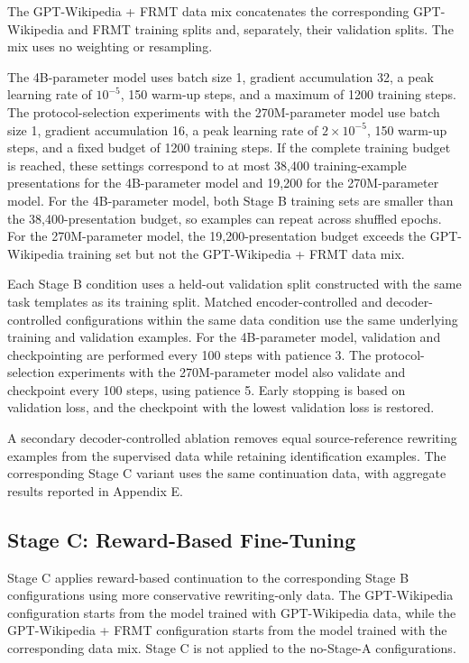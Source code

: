 The GPT-Wikipedia + FRMT data mix concatenates the
corresponding GPT-Wikipedia and FRMT training splits and, separately, their
validation splits. The mix uses no weighting or resampling.

The 4B-parameter model uses batch size 1, gradient accumulation 32, a peak
learning rate of \(10^{-5}\), 150 warm-up steps, and a maximum of 1200 training
steps. The protocol-selection experiments with the 270M-parameter model use batch size
1, gradient accumulation 16, a peak learning rate of \(2\times10^{-5}\), 150
warm-up steps, and a fixed budget of 1200 training steps. If the complete
training budget is reached, these settings correspond to at most 38,400
training-example presentations for the 4B-parameter model and 19,200 for the
270M-parameter model. For the 4B-parameter model, both Stage B training sets are
smaller than the 38,400-presentation budget, so examples can repeat across
shuffled epochs. For the 270M-parameter model, the 19,200-presentation budget
exceeds the GPT-Wikipedia training set but not the GPT-Wikipedia + FRMT data
mix.

Each Stage B condition uses a held-out validation split constructed with the
same task templates as its training split. Matched encoder-controlled and
decoder-controlled configurations within the same data condition use the same
underlying training and validation examples. For the 4B-parameter model, validation and checkpointing are performed every
100 steps with patience 3. The protocol-selection experiments with the 270M-parameter model also validate
and checkpoint every 100 steps, using patience 5. Early stopping is based on validation loss, and the checkpoint with
the lowest validation loss is restored.

A secondary decoder-controlled ablation removes equal source-reference
rewriting examples from the supervised data while retaining identification
examples. The corresponding Stage C variant uses the same continuation data,
with aggregate results reported in Appendix E.

\subsection{Stage C: Reward-Based Fine-Tuning}
\label{sec:method-stage-c}

Stage C applies reward-based continuation to the corresponding Stage B
configurations using more conservative rewriting-only data. The GPT-Wikipedia
configuration starts from the model trained with GPT-Wikipedia data, while the
GPT-Wikipedia + FRMT configuration starts from the model trained with the
corresponding data mix. Stage C is not applied to the no-Stage-A
configurations.

